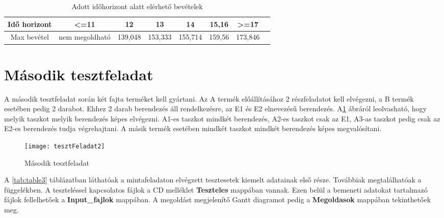 \begin{table}[H]
	\begin{center}
		\caption{Adott időhorizont alatt elérhető bevételek}
  		\captionsetup[table]{skip=10pt}
    	\label{tab:table2}
		\begin{tabular}{|c|c|c|c|c|c|c|c|}
		\hline
		Idő horizont & \textless =11 & 12 & 13 & 14 & 15,16 & \textgreater =17\\
		\hline
		Max bevétel & nem megoldható & 139,048 & 153,333 & 155,714 & 159,56 & 173,846\\
		\hline
		\end{tabular}	
	\end{center}	
\end{table}

\section{Második tesztfeladat}
A második tesztfeladat során két fajta terméket kell gyártani. Az A termék előállításához 2 részfeladatot kell elvégezni, a B termék esetében pedig 2 darabot. Ehhez 2 darab berendezés áll rendelkezésre, az E1 és E2 elnevezésű berendezés. A\ref{tesztFeladat2} ábráról leolvasható, hogy melyik taszkot melyik berendezés képes elvégezni. A1-es taszkot mindkét berendezés, A2-es taszkot csak az E1, A3-as taszkot pedig csak az E2-es berendezés tudja végrehajtani. A másik termék esetében mindkét taszkot mindkét berendezés képes megvalósítani.

\begin{figure}[H]
\begin{center}
\texttt{[image: tesztFeladat2]}
\caption{Második tesztfeladat}
\label{tesztFeladat2}
\end{center}
\end{figure}

A \ref{tab:table3} táblázatban láthatóak a mintafeladaton elvégzett tesztesetek kiemelt adatainak első része. Továbbiak megtalálhatóak a függelékben. A teszteléssel kapcsolatos fájlok a CD melléklet \textbf{Teszteles} mappában vannak. Ezen belül a bemeneti adatokat tartalmazó fájlok fellelhetőek a \textbf{Input\_fajlok} mappában. A megoldást megjelenítő Gantt diagramot pedig a \textbf{Megoldasok} mappában tekinthetőek meg.

